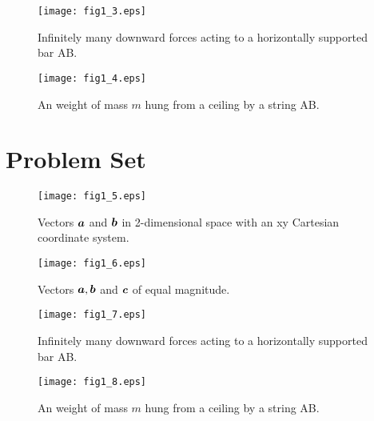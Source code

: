 \documentclass[10pt,a4j]{article}
\begin{document}
\begin{figure}[h]
	\begin{center}
	\texttt{[image: fig1\_3.eps]} 
	\end{center}
	\caption{Infinitely many downward forces acting to a horizontally supported bar AB.}
	\label{fig:fig1_3}
\end{figure}
\begin{figure}[h]
	\begin{center}
	\texttt{[image: fig1\_4.eps]} 
	\end{center}
	\caption{An weight of mass $m$ hung from a ceiling by a string AB.} 
	\label{fig:fig1_4}
\end{figure}
\section*{Problem Set}
\begin{figure}[h]
	\begin{center}
	\texttt{[image: fig1\_5.eps]} 
	\end{center}
	\caption{Vectors $\mbox{\boldmath $a$}$ and $\mbox{\boldmath $b$}$ in 2-dimensional space with an
	xy Cartesian coordinate system.}
	\label{fig:fig1_5}
\end{figure}
\begin{figure}[h]
	\begin{center}
	\texttt{[image: fig1\_6.eps]} 
	\end{center}
	\caption{Vectors $\mbox{\boldmath $a$}, \mbox{\boldmath $b$}$ and $\mbox{\boldmath $c$}$ of equal magnitude.} 
	\label{fig:fig1_6}
\end{figure}
\begin{figure}[h]
	\begin{center}
	\texttt{[image: fig1\_7.eps]} 
	\end{center}
	\caption{Infinitely many downward forces acting to a horizontally supported bar AB.}
	\label{fig:fig1_7}
\end{figure}
\begin{figure}[h]
	\begin{center}
	\texttt{[image: fig1\_8.eps]} 
	\end{center}
	\caption{An weight of mass $m$ hung from a ceiling by a string AB.} 
	\label{fig:fig1_8}
\end{figure}
%
\end{document}
